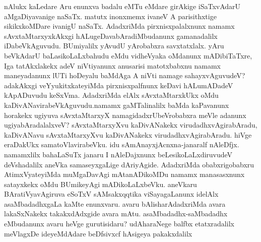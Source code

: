 nAlukx kaLedare Aru enunxva badalu eMTu eMdare girAkige iSaTxvAdarU aMgaDiyavanige naSaTx. matutx inonxmemx ivaneV A pari\-sithxtige sikikx\-koMDare ivanigU naSaTx. AdadxriMda pirxnisxpalalxnunx namamx sAvxtaMtarxyx\-kAkxgi hALugeDavabAradiMbudanunx gamanadalilx iDabeVkAguvudu. BUmiyalilx yAvudU yArobabxra savxtatxlalx. yAru beVkAdarU baLasi\-koLaLx\-bahudu eMdu vidheVyaka oMdanunx mADibiTaTxre, Iga tatAkxlakekx adeV niVtiyanunx anu\-sarisi matotx\-babxnu namamx maneyadanunx lUTi hoDeyalu baMdAga A niVti namage sahayxvAgu\-vudeV? adakAkxgi veYyukitxkateyiMda pirxnisxpalfnunx keDavi hALumADadeV kApADu\-vudu keSxVma. AdadxriMda elAlx sAvxtaM\-tarxkUkx oMdu kaDivANavirabeVkAguvudu.\break \hbox{namamx} gaMTalinalilx baMda kaPa\-vanunx horakekx ugi\-yuva sAvx\-taMtarxyX nama\-gidadxrU\break beVro\-babxra meVle adanunx ugiyabAradalalxveV? sAvxtaMtarxyXvu kaDivANakekx virudadhx\-vAgira\-bAradu, kaDivANavu sAvxtaMtarxyXvu kaDivANakekx virudadhxvAgirabAradu. hiVge eraDakUkx sama\-toVla\-vira\-beVku. idu sAmAnayxjAcnxna-janaralf nAleDfjx. namamxlilx bahaLaSuTx janaru I nAleDajxnunx beLesi\-koLaLx\-diruvudeV deVshadalilx aneVka samaseyx\-gaLige dAriyAgide. AdadxriMda obabxrigobabxru AtimxVyate\-yiMda muMgaDavAgi mAtanADikoMDu namamx manasasxnunx satayxkekx oMdu BUmikeyAgi mADikoLaLxbeVku. aneV\-karu BAratiVyavAgiruva eSoTxV sAMsakxqqtika viSayagaLanunx idelAlx asaMbadadhx\-gaLa kaMte enunxvaru. avaru bA\-lisharAdadxriMda avara lakaSxNakekx takakxdAdxgide avara mAtu. asaMbadadhx-saMbadadhx eMbudanunx avaru heVge gurutisidaru? udA\-haraNege balfbx etatxradalilx meVlagxDe ideyeMdAdare beDfsivxcf hAsigeya pakakx\-dalilx 
